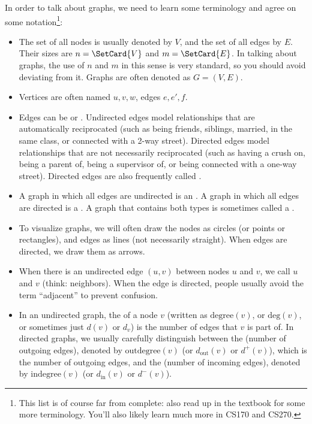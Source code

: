 In order to talk about graphs, we need to learn some terminology and
agree on some notation\footnote{This list is of course far from
  complete: also read up in the textbook for some more
  terminology. You'll also likely learn much more in CS170 and CS270.}:
\begin{itemize}
\item The set of all nodes is usually denoted by $V$, and the set of
  all edges by $E$. Their sizes are $n = \SetCard{V}$ and $m = \SetCard{E}$.
  In talking about graphs, the use of $n$ and $m$ in this sense is
  very standard, so you should avoid deviating from it.
  Graphs are often denoted as $G=(V,E)$.
\item Vertices are often named $u,v,w$, edges $e,e',f$.
\item Edges can be  or . 
  Undirected   edges model relationships that are automatically
  reciprocated (such as being friends, siblings, married, in the same
  class, or connected with a 2-way street). 
  Directed edges model relationships that are not necessarily
  reciprocated (such as having a crush on, being a parent of, being a
  supervisor of, or being connected with a one-way street).
  Directed edges are also frequently called .
\item A graph in which all edges are undirected is an . A graph in which all edges are directed is a
  . A graph that contains both types is sometimes
  called a .
\item To visualize graphs, we will often draw the nodes as circles (or
  points or rectangles), and edges as lines (not necessarily
  straight). When edges are directed, we draw them as arrows.
\item When there is an undirected edge $(u,v)$ between nodes $u$ and
  $v$, we call $u$ and $v$  (think: neighbors).
  When the edge is directed, people usually avoid the term
  ``adjacent'' to prevent confusion.
\item In an undirected graph, the  of a node $v$ (written
  as $\text{degree}(v)$, or $\text{deg}(v)$, or sometimes just
$d(v)$ or $d_v$) is the number of edges that $v$ is part of.
In directed graphs, we usually carefully distinguish between the
 (number of outgoing edges), denoted by
$\text{outdegree}(v)$ (or $d_{\text{out}}(v)$ or $d^+(v)$),
which is the number of outgoing edges,
and the  (number of incoming edges), denoted by
$\text{indegree}(v)$ (or $d_{\text{in}}(v)$ or $d^-(v)$).
\end{itemize}

